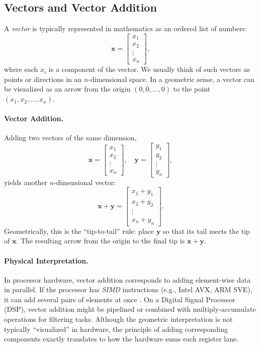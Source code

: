 \subsection{Vectors and Vector Addition}
A \emph{vector} is typically represented in mathematics as an ordered list of numbers:
\[
\mathbf{x} = \begin{bmatrix} x_1 \\ x_2 \\ \vdots \\ x_n \end{bmatrix},
\]
where each $x_i$ is a component of the vector. We usually think of such vectors as points or directions in an $n$-dimensional space. In a geometric sense, a vector can be visualized as an arrow from the origin $(0,0,\ldots,0)$ to the point $(x_1, x_2, \ldots, x_n)$.

\paragraph{Vector Addition.} 
Adding two vectors of the same dimension,
\[
\mathbf{x} = \begin{bmatrix} x_1 \\ x_2 \\ \vdots \\ x_n \end{bmatrix}, 
\quad
\mathbf{y} = \begin{bmatrix} y_1 \\ y_2 \\ \vdots \\ y_n \end{bmatrix},
\]
yields another $n$-dimensional vector:
\[
\mathbf{x} + \mathbf{y} 
= \begin{bmatrix} x_1 + y_1 \\ x_2 + y_2 \\ \vdots \\ x_n + y_n \end{bmatrix}.
\]
Geometrically, this is the “tip-to-tail” rule: place $\mathbf{y}$ so that its tail meets the tip of $\mathbf{x}$. The resulting arrow from the origin to the final tip is $\mathbf{x} + \mathbf{y}$. 

\paragraph{Physical Interpretation.} 
In processor hardware, vector addition corresponds to adding element-wise data in parallel. If the processor has \emph{SIMD} instructions (e.g., Intel AVX, ARM SVE), it can add several pairs of elements at once \cite{lilja2000exploiting, stephens2017arm}. On a Digital Signal Processor (DSP), vector addition might be pipelined or combined with multiply-accumulate operations for filtering tasks. Although the geometric interpretation is not typically “visualized” in hardware, the principle of adding corresponding components exactly translates to how the hardware sums each register lane.

